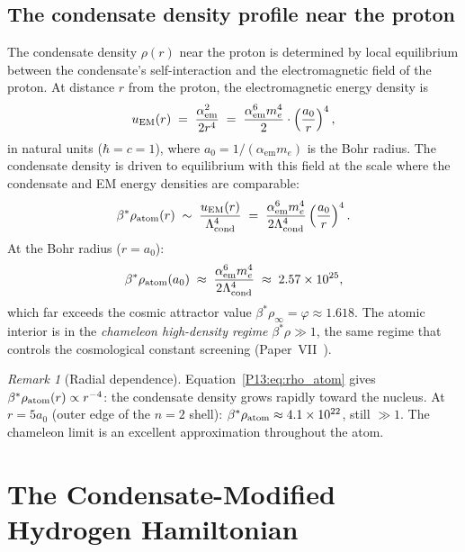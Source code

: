\documentclass[11pt,a4paper]{article}
\theoremstyle{definition}
\theoremstyle{remark}
\newtheorem{remark}[theorem]{Remark}
\newcommand{\vp}{\varphi}
\newcommand{\bst}{\beta^{*}}
\newcommand{\Lcond}{\Lambda_{\mathrm{cond}}}
\newcommand{\aem}{\alpha_{\mathrm{em}}}
\newcommand{\rhoinf}{\rho_{\infty}}
\begin{document}
\subsection{The condensate density profile near the proton}

The condensate density $\rho(r)$ near the proton is determined by
local equilibrium between the condensate's self-interaction and the
electromagnetic field of the proton.
At distance $r$ from the proton, the electromagnetic energy density is
\begin{equation}
  u_{\rm EM}(r)
  \;=\; \frac{\aem^2}{2r^4}
  \;=\; \frac{\aem^6 m_e^4}{2}\cdot\left(\frac{a_0}{r}\right)^4,
  \label{P13:eq:uEM}
\end{equation}
in natural units ($\hbar=c=1$), where $a_0 = 1/(\aem m_e)$ is the
Bohr radius.
The condensate density is driven to equilibrium with this field
at the scale where the condensate and EM energy densities are comparable:
\begin{equation}
  \bst\rho_{\rm atom}(r)
  \;\sim\;
  \frac{u_{\rm EM}(r)}{\Lcond^4}
  \;=\; \frac{\aem^6 m_e^4}{2\Lcond^4}
        \left(\frac{a_0}{r}\right)^4.
  \label{P13:eq:rho_atom}
\end{equation}
At the Bohr radius ($r = a_0$):
\begin{equation}
  \bst\rho_{\rm atom}(a_0)
  \;\approx\; \frac{\aem^6 m_e^4}{2\Lcond^4}
  \;\approx\; 2.57\times10^{25},
  \label{P13:eq:rho_atom_a0}
\end{equation}
which far exceeds the cosmic attractor value
$\bst\rhoinf = \vp \approx 1.618$.
The atomic interior is in the \emph{chameleon high-density regime}
$\bst\rho\gg1$, the same regime that controls the cosmological
constant screening (Paper~VII~\cite{Paper7}).

\begin{remark}[Radial dependence]
\label{P13:rem:radial_dep}
Equation~\eqref{P13:eq:rho_atom} gives $\bst\rho_{\rm atom}(r)\propto r^{-4}$:
the condensate density grows rapidly toward the nucleus.
At $r = 5a_0$ (outer edge of the $n=2$ shell):
$\bst\rho_{\rm atom}\approx4.1\times10^{22}$, still $\gg1$.
The chameleon limit is an excellent approximation throughout the atom.
\end{remark}

\section{The Condensate-Modified Hydrogen Hamiltonian}
\label{P13:sec:modified_H}
\end{document}
